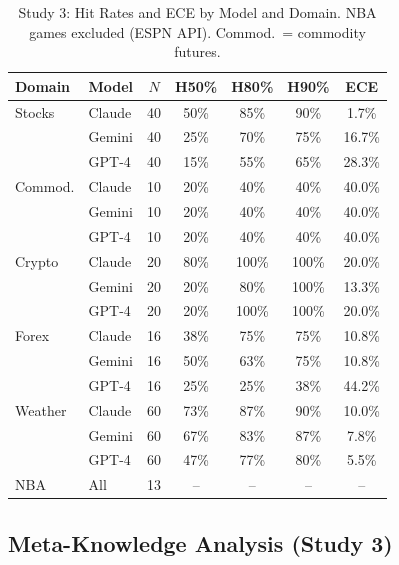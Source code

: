 \begin{table}[ht]
  \centering
  \caption{Study 3: Hit Rates and ECE by Model and Domain.
    NBA games excluded (ESPN API). Commod.\ = commodity futures.}
  \label{tab:study3-domain}
  \small
  \begin{tabular}{llccccc}
    \toprule
    Domain     & Model  & $N$ & H50\% & H80\%  & H90\%  & ECE    \\
    \midrule
    Stocks     & Claude & 40  & 50\%  & 85\%   & 90\%   & 1.7\%  \\
               & Gemini & 40  & 25\%  & 70\%   & 75\%   & 16.7\% \\
               & GPT-4  & 40  & 15\%  & 55\%   & 65\%   & 28.3\% \\
    Commod.    & Claude & 10  & 20\%  & 40\%   & 40\%   & 40.0\% \\
               & Gemini & 10  & 20\%  & 40\%   & 40\%   & 40.0\% \\
               & GPT-4  & 10  & 20\%  & 40\%   & 40\%   & 40.0\% \\
    Crypto     & Claude & 20  & 80\%  & 100\%  & 100\%  & 20.0\% \\
               & Gemini & 20  & 20\%  & 80\%   & 100\%  & 13.3\% \\
               & GPT-4  & 20  & 20\%  & 100\%  & 100\%  & 20.0\% \\
    Forex      & Claude & 16  & 38\%  & 75\%   & 75\%   & 10.8\% \\
               & Gemini & 16  & 50\%  & 63\%   & 75\%   & 10.8\% \\
               & GPT-4  & 16  & 25\%  & 25\%   & 38\%   & 44.2\% \\
    Weather    & Claude & 60  & 73\%  & 87\%   & 90\%   & 10.0\% \\
               & Gemini & 60  & 67\%  & 83\%   & 87\%   & 7.8\%  \\
               & GPT-4  & 60  & 47\%  & 77\%   & 80\%   & 5.5\%  \\
    NBA        & All    & 13  & --    & --     & --     & --     \\
    \bottomrule
  \end{tabular}
\end{table}

\subsection{Meta-Knowledge Analysis (Study 3)}
\label{sec:results-metaknowledge}

